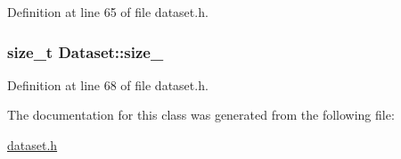 Definition at line 65 of file dataset.\-h.

\hypertarget{class_dataset_aa9b7df288645726976e883b45180d84d}{
\subsubsection[{size\-\_\-}]{\setlength{\rightskip}{0pt plus 5cm}size\-\_\-t {\bf Dataset\-::size\-\_\-}}}\label{class_dataset_aa9b7df288645726976e883b45180d84d}


Definition at line 68 of file dataset.\-h.



The documentation for this class was generated from the following file\-:\begin{DoxyCompactItemize}
\item 
\hyperlink{dataset_8h}{dataset.\-h}\end{DoxyCompactItemize}
